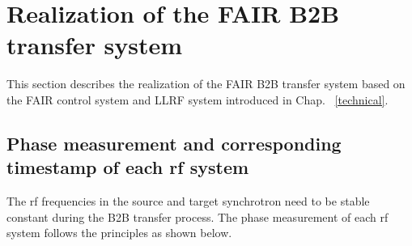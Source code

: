 %
% 
\section{Realization of the FAIR B2B transfer system}
This section describes the realization of the FAIR B2B transfer system based on the FAIR control system and LLRF system introduced in Chap. ~\ref{technical}.
%
\subsection{Phase measurement and corresponding timestamp of each rf system}
The rf frequencies in the source and target synchrotron need to be stable constant during the B2B transfer process. The phase measurement of each rf system follows the principles as shown below.

